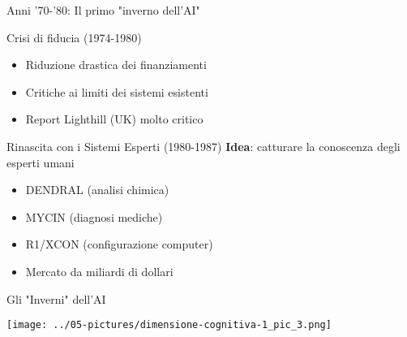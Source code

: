 \documentclass[aspectratio=169,12pt]{beamer}
\begin{document}
%
%
\begin{frame}{Anni '70-'80: Il primo "inverno dell'AI"}
    \begin{alertblock}{Crisi di fiducia (1974-1980)}
        \begin{itemize}
            \item Riduzione drastica dei finanziamenti
            \item Critiche ai limiti dei sistemi esistenti
            \item Report Lighthill (UK) molto critico
        \end{itemize}
    \end{alertblock}
    
    \vspace{0.3cm}
    
    \begin{block}{Rinascita con i Sistemi Esperti (1980-1987)}
        \textbf{Idea}: catturare la conoscenza degli esperti umani
        \begin{itemize}
            \item DENDRAL (analisi chimica)
            \item MYCIN (diagnosi mediche)
            \item R1/XCON (configurazione computer)
            \item Mercato da miliardi di dollari
        \end{itemize}
    \end{block}
\end{frame}
%
%
\begin{frame}{Gli "Inverni" dell'AI}
\begin{center}
\texttt{[image: ../05-pictures/dimensione-cognitiva-1\_pic\_3.png]} 
\end{center}
\end{frame}
%
%
\end{document}
